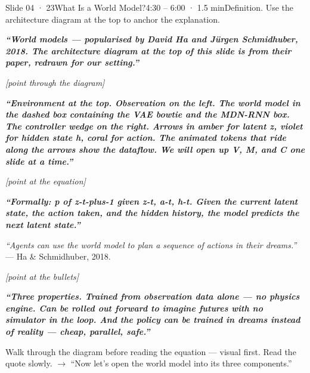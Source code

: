 \documentclass[11pt,a4paper]{article}
\newcommand{\say}[1]{%
    \par\vspace{0.3em}%
    \begingroup
    \leftskip=12pt
    \rightskip=8pt
    \color{thStrong}%
    \itshape\textbf{“#1”}%
    \par
    \endgroup
    \vspace{0.2em}
}
\newcommand{\stage}[1]{%
    \par\textcolor{thMuted}{\small\textit{[#1]}}\par
    \vspace{0.2em}
}
\newcommand{\emphw}[1]{\textbf{\textcolor{thAmber}{#1}}}
\newcommand{\emphteal}[1]{\textbf{\textcolor{thTeal}{#1}}}
\newcommand{\emphviolet}[1]{\textbf{\textcolor{thViolet}{#1}}}
\begin{document}
\begin{slide}{Slide 04 · 23}{What Is a World Model?}{4:30 – 6:00 · 1.5 min}{Definition. Use the architecture diagram at the top to anchor the explanation.}
\say{World models — popularised by \textbf{David Ha and Jürgen Schmidhuber, 2018}. The architecture diagram at the top of this slide is from their paper, redrawn for our setting.}

\stage{point through the diagram}

\say{Environment at the top. Observation on the left. The world model in the dashed box containing the \emphw{VAE bowtie} and the \emphviolet{MDN-RNN box}. The \emphteal{controller wedge} on the right. Arrows in amber for latent z, violet for hidden state h, coral for action. The animated tokens that ride along the arrows show the dataflow. We will open up V, M, and C one slide at a time.}

\stage{point at the equation}

\say{Formally: \textbf{p of z-t-plus-1 given z-t, a-t, h-t}. Given the current latent state, the action taken, and the hidden history, the model predicts the next latent state.}

\begin{quoteblock}
\textit{``Agents can use the world model to plan a sequence of actions in their dreams.''}\\[2pt]
\hfill — Ha \& Schmidhuber, 2018.
\end{quoteblock}

\stage{point at the bullets}

\say{Three properties. Trained from \textbf{observation data alone} — no physics engine. Can be \textbf{rolled out forward} to imagine futures with no simulator in the loop. And the policy can be trained in \emphteal{dreams} instead of reality — cheap, parallel, safe.}

\begin{stagebox}
Walk through the diagram before reading the equation — visual first. Read the quote slowly. $\rightarrow$ ``Now let's open the world model into its three components.''
\end{stagebox}
\end{slide}
\end{document}
